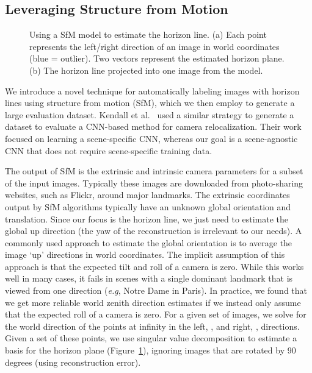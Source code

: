 \documentclass{bmvc2k}
\makeatletter
\newcommand{\figref}[1]{Figure~\ref{fig:#1}}
\newcommand*{\eg}{e.g.\@\xspace}
\def\eg{\emph{e.g}\bmvaOneDot}
\makeatother
\begin{document}
\subsection{Leveraging Structure from Motion}
\label{sec:sfm}

\begin{figure}
 
  \centering
 

  \caption{Using a SfM model to estimate the horizon line. (a) Each
  point represents the left/right direction of an image in world
  coordinates (blue = outlier). Two vectors represent the estimated
  horizon plane. (b) The horizon line projected into one image from
  the model.}
  
  \label{fig:sfm}
\end{figure}

We introduce a novel technique for automatically
labeling images with horizon lines using structure from motion (SfM),
which we then employ to generate a large evaluation dataset. Kendall
et al.~\cite{kendall2015convolutional} used a similar strategy to
generate a dataset to evaluate a CNN-based method for camera
relocalization. Their work focused on learning a scene-specific CNN,
whereas our goal is a scene-agnostic CNN that does not require
scene-specific training data.

The output of SfM is the extrinsic and intrinsic camera parameters for
a subset of the input images. Typically these images are downloaded
from photo-sharing websites, such as Flickr, around major landmarks.
The extrinsic coordinates output by SfM algorithms typically have an
unknown global orientation and translation. Since our focus is the
horizon line, we just need to estimate the global up direction (the
yaw of the reconstruction is irrelevant to our needs).  A commonly
used 
approach to estimate the global orientation is to average the image
`up' directions in world coordinates.  The implicit assumption of this
approach is that the expected tilt and roll of a camera is zero.
While this works well in many cases, it fails in scenes with a single
dominant landmark that is viewed from one direction (\eg, Notre Dame
in Paris). 
In practice, we found that we get more reliable world zenith direction
estimates if we instead only assume that the expected roll of a camera
is zero. For a given set of images, we solve for the world direction of
the points at infinity in the left, , and right, ,
directions. Given a set of these points, we use singular value
decomposition to estimate a basis for the horizon plane
(\figref{sfm}), ignoring images that are rotated by 90 degrees (using
reconstruction error).
\end{document}
